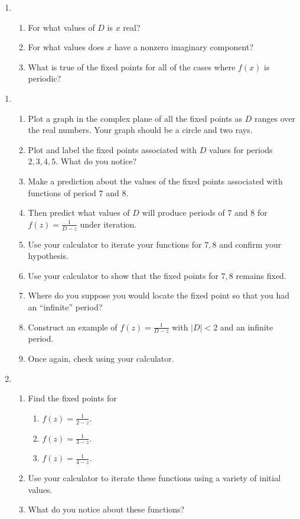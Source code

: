 \documentclass[../gatm_answers.tex]{subfiles}
\begin{document}
\begin{enumerate}
\setcounter{enumi}{\value{problem_i}}
\item \begin{enumerate}
\item For what values of $D$ is $x$ real?
\item For what values does $x$ have a nonzero imaginary component?
\item What is true of the fixed points for all of the cases where $f(x)$ is periodic?
\end{enumerate}
\setcounter{problem_i}{\value{enumi}}
\end{enumerate}


\begin{enumerate}
\setcounter{enumi}{\value{problem_i}}
\item \begin{enumerate}
\item Plot a graph in the complex plane of all the fixed points as $D$ ranges over the real numbers. Your graph should be a circle and two rays.
\item Plot and label the fixed points associated with $D$ values for periods $2,3,4,5$. What do you notice?
\item Make a prediction about the values of the fixed points associated with functions of period $7$ and $8$.
\item Then predict what values of $D$ will produce periods of $7$ and $8$ for $f(z)=\frac{1}{D-z}$ under iteration.
\item Use your calculator to iterate your functions for $7,8$ and confirm your hypothesis.
\item Use your calculator to show that the fixed points for $7,8$ remains fixed.
\item Where do you suppose you would locate the fixed point so that you had an ``infinite'' period?
\item Construct an example of $f(z)=\frac{1}{D-z}$ with $|D|<2$ and an infinite period.
\item Once again, check using your calculator.
\end{enumerate}
\item \begin{enumerate}
\item Find the fixed points for \begin{multicols}{3}
\begin{enumerate}
\item $f(z)=\frac{1}{2-z}.$
\item $f(z)=\frac{1}{3-z}.$
\item $f(z)=\frac{1}{4-z}.$
\end{enumerate}
\end{multicols}
\item Use your calculator to iterate these functions using a variety of initial values.
\item What do you notice about these functions?
\end{enumerate}
\setcounter{problem_i}{\value{enumi}}
\end{enumerate}
\end{document}

